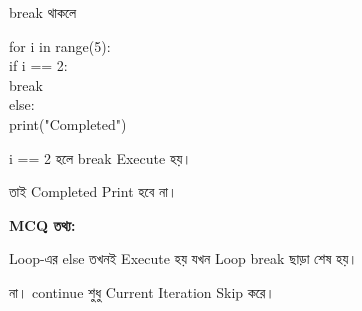 \begin{codeoutputbox}{\textenglish{\ttfamily break} থাকলে}

\noindent
\begin{minipage}[t]{0.53\linewidth}
\codeheading

\begin{english}
\ttfamily
for i in range(5):\\
\hspace*{4mm}if i == 2:\\
\hspace*{8mm}break\\
else:\\
\hspace*{4mm}print("Completed")
\end{english}

\end{minipage}
\hfill
\begin{minipage}[t]{0.43\linewidth}
\outputheading

\textenglish{\ttfamily i == 2}
হলে
\textenglish{\ttfamily break}
Execute হয়।

তাই
\textenglish{\ttfamily Completed}
Print হবে না।

\medskip

\textbf{\color{deepOrange}MCQ তথ্য:}

Loop-এর
\textenglish{\ttfamily else}
তখনই Execute হয় যখন Loop
\textenglish{\ttfamily break}
ছাড়া শেষ হয়।

\end{minipage}

\end{codeoutputbox}



না।
\textenglish{\ttfamily continue}
শুধু Current Iteration Skip করে।


